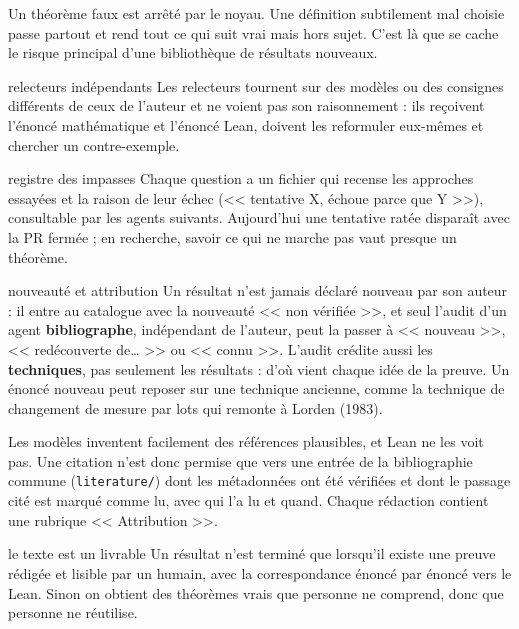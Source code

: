 \documentclass[11pt,a4paper]{article}
\begin{document}
\begin{pourquoi}
Un théorème faux est arrêté par le noyau. Une définition subtilement mal choisie passe partout et
rend tout ce qui suit vrai mais hors sujet. C'est là que se cache le risque principal d'une
bibliothèque de résultats nouveaux.
\end{pourquoi}

\begin{regle}{relecteurs indépendants}
Les relecteurs tournent sur des modèles ou des consignes différents de ceux de l'auteur et ne voient
pas son raisonnement : ils reçoivent l'énoncé mathématique et l'énoncé Lean, doivent les reformuler
eux-mêmes et chercher un contre-exemple.
\end{regle}

\begin{regle}{registre des impasses}
Chaque question a un fichier qui recense les approches essayées et la raison de leur échec
(<< tentative X, échoue parce que Y >>), consultable par les agents suivants. Aujourd'hui une
tentative ratée disparaît avec la PR fermée ; en recherche, savoir ce qui ne marche pas vaut
presque un théorème.
\end{regle}

\begin{regle}{nouveauté et attribution}\label{sec:biblio}
Un résultat n'est jamais déclaré nouveau par son auteur : il entre au catalogue avec la nouveauté
<< non vérifiée >>, et seul l'audit d'un agent \textbf{bibliographe}, indépendant de l'auteur,
peut la passer à << nouveau >>, << redécouverte de\dots{} >> ou << connu >>. L'audit crédite aussi les
\textbf{techniques}, pas seulement les résultats : d'où vient chaque idée de la preuve. Un énoncé
nouveau peut reposer sur une technique ancienne, comme la technique de changement de mesure par lots
qui remonte à Lorden (1983).

Les modèles inventent facilement des références plausibles, et Lean ne les voit pas. Une citation
n'est donc permise que vers une entrée de la bibliographie commune (\texttt{literature/}) dont les
métadonnées ont été vérifiées et dont le passage cité est marqué comme lu, avec qui l'a lu et quand.
Chaque rédaction contient une rubrique << Attribution >>.
\end{regle}

\begin{regle}{le texte est un livrable}
Un résultat n'est terminé que lorsqu'il existe une preuve rédigée et lisible par un humain, avec la
correspondance énoncé par énoncé vers le Lean. Sinon on obtient des théorèmes vrais que personne ne
comprend, donc que personne ne réutilise.
\end{regle}
\end{document}
